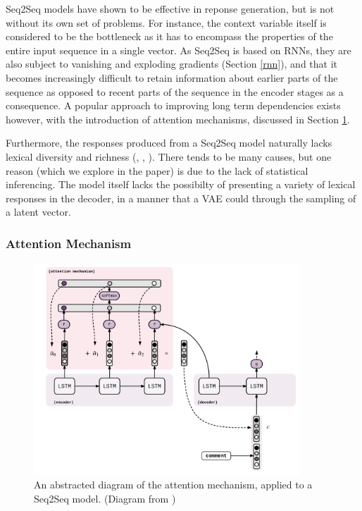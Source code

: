 \documentclass[12pt,twoside]{report}
\begin{document}
Seq2Seq models have shown to be effective in reponse generation, but is not without its own set of problems. For instance, the context variable itself is considered to be the bottleneck as it has to encompass the properties of the entire input sequence in a single vector. As Seq2Seq is based on RNNs, they are also subject to vanishing and exploding gradients (Section \ref{rnn}), and that it becomes increasingly difficult to retain information about earlier parts of the sequence as opposed to recent parts of the sequence in the encoder stages as a consequence. A popular approach to improving long term dependencies exists however, with the introduction of attention mechanisms, discussed in Section \ref{seq2seq_attn}.

Furthermore, the responses produced from a Seq2Seq model naturally lacks lexical diversity and richness (\cite{serban_hierarchical_2016}, \cite{zhao_learning_2017}, \cite{jiang_why_2018}). There tends to be many causes, but one reason (which we explore in the paper) is due to the lack of statistical inferencing. The model itself lacks the possibilty of presenting a variety of lexical responses in the decoder, in a manner that a VAE could through the sampling of a latent vector.

\subsubsection{Attention Mechanism}

\begin{figure}[!ht]
      
	\centering
	\includegraphics[width=100mm]{diagrams/seq2seq_attention_mechanism.pdf}
	\caption{An abstracted diagram of the attention mechanism, applied to a Seq2Seq model. (Diagram from \cite{genthial_seq2seq_2017})\label{seq2seq_attn}}
\end{figure}
\end{document}
